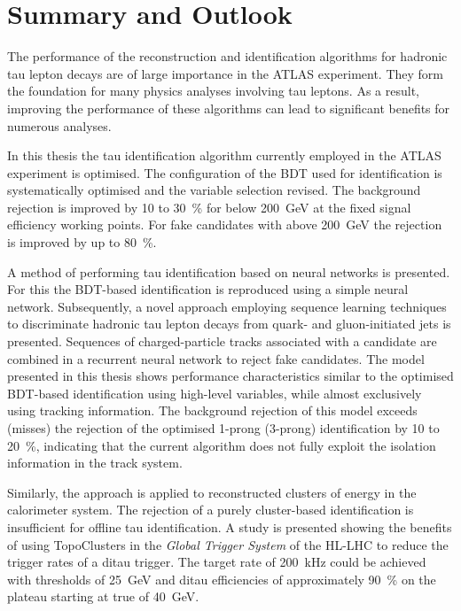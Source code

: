 \chapter{Summary and Outlook}
\label{sec:conclusion}

The performance of the reconstruction and identification algorithms for hadronic
tau lepton decays are of large importance in the ATLAS experiment. They form the
foundation for many physics analyses involving tau leptons. As a result,
improving the performance of these algorithms can lead to significant benefits
for numerous analyses.

In this thesis the tau identification algorithm currently employed in the ATLAS
experiment is optimised. The configuration of the BDT used for identification is
systematically optimised and the variable selection revised. The background
rejection is improved by \num{10} to \SI{30}{\percent} for \tauhadvis \pt below
\SI{200}{\GeV} at the fixed signal efficiency working points. For fake
\tauhadvis candidates with \pt above \SI{200}{\GeV} the rejection is improved by
up to \SI{80}{\percent}.

A method of performing tau identification based on neural networks is presented.
For this the BDT-based identification is reproduced using a simple neural
network. Subsequently, a novel approach employing sequence learning techniques
to discriminate hadronic tau lepton decays from quark- and gluon-initiated jets
is presented. Sequences of charged-particle tracks associated with a \tauhadvis
candidate are combined in a recurrent neural network to reject fake \tauhadvis
candidates. The model presented in this thesis shows performance characteristics
similar to the optimised BDT-based identification using high-level variables,
while almost exclusively using tracking information. The background rejection of
this model exceeds (misses) the rejection of the optimised 1-prong (3-prong)
identification by \num{10} to \SI{20}{\percent}, indicating that the current
algorithm does not fully exploit the isolation information in the track system.

Similarly, the approach is applied to reconstructed clusters of energy in the
calorimeter system. The rejection of a purely cluster-based identification is
insufficient for offline tau identification. A study is presented showing the
benefits of using TopoClusters in the \emph{Global Trigger System} of the HL-LHC
to reduce the trigger rates of a ditau trigger. The target rate of
\SI{200}{\kilo\hertz} could be achieved with \tauhadvis \pt thresholds of
\SI{25}{\GeV} and ditau efficiencies of approximately \SI{90}{\percent} on the
plateau starting at true \tauhadvis \pt of \SI{40}{\GeV}.

